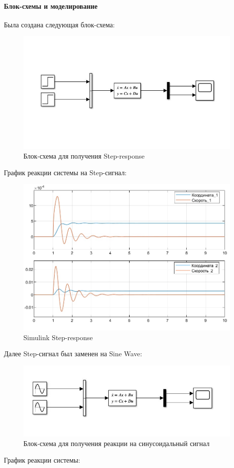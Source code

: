 \documentclass{article}
\begin{document}
	\paragraph*{Блок-схемы и моделирование}
	Была создана следующая блок-схема:
	\begin{figure}[H]
		\centering
		\includegraphics[width=0.7\linewidth]{sx_1}
		\caption{Блок-схема для получения Step-response}
		\label{fig:sx1}
	\end{figure}
	График реакции системы на Step-сигнал:
	\begin{figure}[H]
		\centering
		\includegraphics[width=0.7\linewidth]{sstep}
		\caption{Simulink Step-response}
		\label{fig:sstep}
	\end{figure}
	Далее Step-сигнал был заменен на Sine Wave:
	\begin{figure}[H]
		\centering
		\includegraphics[width=0.7\linewidth]{sx2}
		\caption{Блок-схема для получения реакции на синусоидальный сигнал}
		\label{fig:sx2}
	\end{figure}
	График реакции системы:
\end{document}
